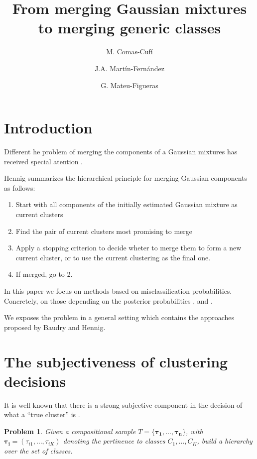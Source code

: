 \documentclass[10pt, a4paper]{article}
\title{From merging Gaussian mixtures to merging generic classes}
\author{M. Comas-Cufí \and J.A. Martín-Fernández \and G. Mateu-Figueras}
\newtheorem{prob}{Problem}
\begin{document}
\maketitle

\section{Introduction}

Different he problem of merging the components of a Gaussian mixtures has received special atention \cite{melnykov2013distribution,lee2004combining,hennig2010methods,baudry2010combining,pastore2013merging}. 

Hennig summarizes the hierarchical principle for merging Gaussian components as follows:
\begin{enumerate}
\item Start with all components of the initially estimated Gaussian mixture as current clusters
\item Find the pair of current clusters most promising to merge
\item Apply a stopping criterion to decide wheter to merge them to form a new current cluster, or to use the current clustering as the final one.
\item If merged, go to 2.
\end{enumerate}


In this paper we focus on methods based on misclassification probabilities. Concretely, on those depending on the posterior probabilities \citep{melnykov2013distribution}, \citep{baudry2010combining} and \citep[in \textsc{demp} approach]{hennig2010methods}.


We exposes the problem in a general setting which contains the approaches proposed by Baudry and Hennig.

\section{The subjectiveness of clustering decisions}

It is well known that there is a strong subjective component in the decision of what a ``true cluster'' is \citep{hennig2010methods}.

\begin{prob}
Given a compositional sample $T = \{ \boldsymbol{\tau_1}, \dots, \boldsymbol{\tau_n} \}$, with $\boldsymbol{\tau_i} = (\tau_{i1}, \dots, \tau_{iK})$ denoting the pertinence to classes $C_1, \dots, C_K$, build a hierarchy over the set of classes.
\end{prob}



{}
\end{document}
